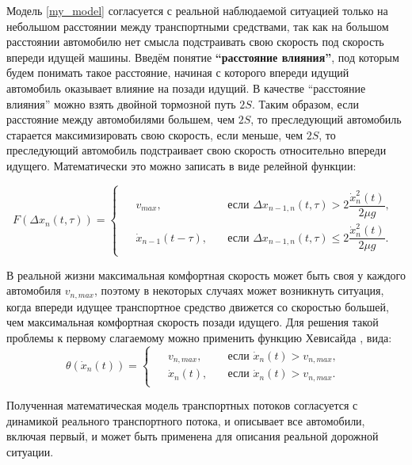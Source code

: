 \documentclass[12pt, a4paper]{extarticle}
\numberwithin{equation}{section}
\numberwithin{figure}{section}
\begin{document}
Модель \eqref{my_model} согласуется с реальной наблюдаемой ситуацией только на небольшом расстоянии между транспортными средствами, так как на большом расстоянии автомобилю нет смысла подстраивать свою скорость под скорость впереди идущей машины. Введём понятие \textbf{``расстояние влияния''}, под которым будем понимать такое расстояние, начиная с которого впереди идущий автомобиль оказывает влияние на позади идущий. В качестве ``расстояние влияния'' можно взять двойной тормозной путь $2S$. Таким образом, если расстояние между автомобилями большем, чем  $2S$, то преследующий автомобиль старается максимизировать свою скорость, если меньше, чем  $2S$, то преследующий автомобиль подстраивает свою скорость относительно впереди идущего. Математически это можно записать в виде релейной функции:

\begin{equation*}
F(\Delta x_{n}(t,\tau))=
\begin{cases}
\begin{split}
&v_{max},\quad &\text{если }\Delta x_{n-1,n}(t,\tau) > 2\dfrac{\dot{x}_n^2(t)}{2\mu g}, \\
&\dot{x}_{n-1}(t-\tau),\quad &\text{если }\Delta x_{n-1,n}(t,\tau) \leq 2\dfrac{\dot{x}_n^2(t)}{2\mu g}.
\end{split}
\end{cases}
\end{equation*}

В реальной жизни максимальная комфортная скорость может быть своя у каждого автомобиля $v_{n,max}$, поэтому в некоторых случаях может возникнуть ситуация, когда впереди идущее транспортное средство движется со скоростью большей, чем максимальная комфортная скорость позади идущего. Для решения такой проблемы к первому слагаемому можно применить функцию Хевисайда \cite{Heaviside_function}, вида:
\begin{equation*}
\theta(\dot{x}_n(t))=
\begin{cases}
\begin{split}
&v_{n,max},\quad &\text{если }\dot{x}_n(t)>v_{n,max}, \\
&\dot{x}_n(t),\quad &\text{если }\dot{x}_n(t)>v_{n,max}.
\end{split}
\end{cases}
\end{equation*}

Полученная математическая модель транспортных потоков согласуется с динамикой реального транспортного потока, и описывает все автомобили, включая первый, и может быть применена для описания реальной дорожной ситуации.
\end{document}
